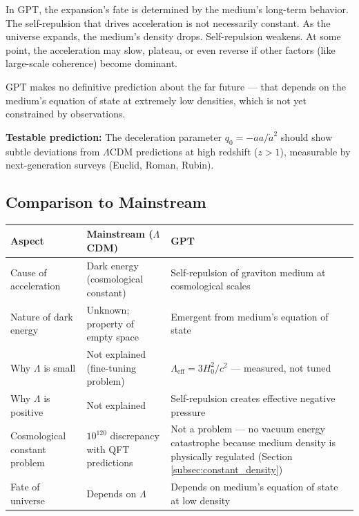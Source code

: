 \documentclass[12pt, a4paper]{article}
\begin{document}
In GPT, the expansion's fate is determined by the medium's long-term behavior. The self-repulsion that drives acceleration is not necessarily constant. As the universe expands, the medium's density drops. Self-repulsion weakens. At some point, the acceleration may slow, plateau, or even reverse if other factors (like large-scale coherence) become dominant.

GPT makes no definitive prediction about the far future — that depends on the medium's equation of state at extremely low densities, which is not yet constrained by observations.

\textbf{Testable prediction:} The deceleration parameter \( q_0 = -\ddot{a}a/\dot{a}^2 \) should show subtle deviations from \(\Lambda\)CDM predictions at high redshift (\(z > 1\)), measurable by next-generation surveys (Euclid, Roman, Rubin).

\subsection{Comparison to Mainstream}
\label{subsec:darkenergy_comparison}

\begin{center}
\begin{tabular}{|p{4cm}|p{5cm}|p{5cm}|}
\hline
\textbf{Aspect} & \textbf{Mainstream (\(\Lambda\)CDM)} & \textbf{GPT} \\
\hline
Cause of acceleration & Dark energy (cosmological constant) & Self-repulsion of graviton medium at cosmological scales \\
\hline
Nature of dark energy & Unknown; property of empty space & Emergent from medium's equation of state \\
\hline
Why \( \Lambda \) is small & Not explained (fine-tuning problem) & \( \Lambda_{\text{eff}} = 3H_0^2/c^2 \) — measured, not tuned \\
\hline
Why \( \Lambda \) is positive & Not explained & Self-repulsion creates effective negative pressure \\
\hline
Cosmological constant problem & \( 10^{120} \) discrepancy with QFT predictions & Not a problem — no vacuum energy catastrophe because medium density is physically regulated (Section \ref{subsec:constant_density}) \\
\hline
Fate of universe & Depends on \( \Lambda \) & Depends on medium's equation of state at low density \\
\hline
\end{tabular}
\end{center}
\end{document}
